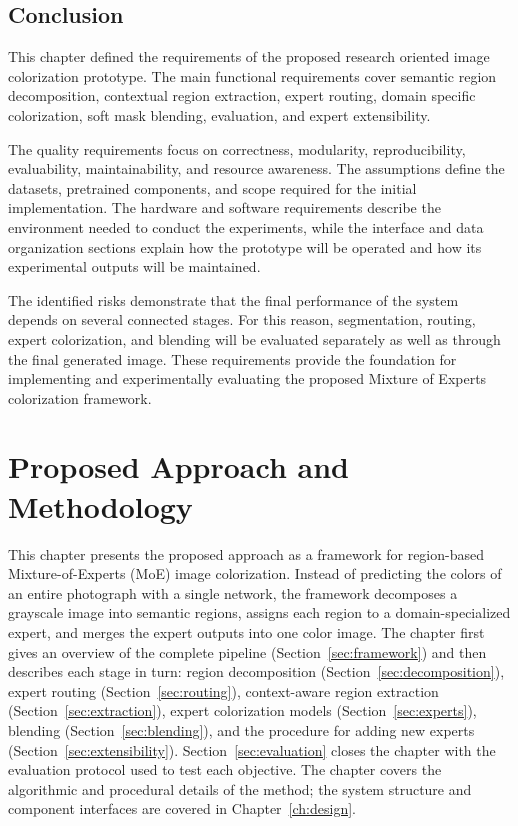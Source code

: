 \documentclass{FastFyp}
\begin{document}
\section{Conclusion}

This chapter defined the requirements of the proposed research oriented image colorization prototype. The main functional requirements cover semantic region decomposition, contextual region extraction, expert routing, domain specific colorization, soft mask blending, evaluation, and expert extensibility.

The quality requirements focus on correctness, modularity, reproducibility, evaluability, maintainability, and resource awareness. The assumptions define the datasets, pretrained components, and scope required for the initial implementation. The hardware and software requirements describe the environment needed to conduct the experiments, while the interface and data organization sections explain how the prototype will be operated and how its experimental outputs will be maintained.

The identified risks demonstrate that the final performance of the system depends on several connected stages. For this reason, segmentation, routing, expert colorization, and blending will be evaluated separately as well as through the final generated image. These requirements provide the foundation for implementing and experimentally evaluating the proposed Mixture of Experts colorization framework.

\chapter{Proposed Approach and Methodology}
\label{ch:method}

This chapter presents the proposed approach as a framework for region-based Mixture-of-Experts (MoE) image colorization. Instead of predicting the colors of an entire photograph with a single network, the framework decomposes a grayscale image into semantic regions, assigns each region to a domain-specialized expert, and merges the expert outputs into one color image. The chapter first gives an overview of the complete pipeline (Section~\ref{sec:framework}) and then describes each stage in turn: region decomposition (Section~\ref{sec:decomposition}), expert routing (Section~\ref{sec:routing}), context-aware region extraction (Section~\ref{sec:extraction}), expert colorization models (Section~\ref{sec:experts}), blending (Section~\ref{sec:blending}), and the procedure for adding new experts (Section~\ref{sec:extensibility}). Section~\ref{sec:evaluation} closes the chapter with the evaluation protocol used to test each objective. The chapter covers the algorithmic and procedural details of the method; the system structure and component interfaces are covered in Chapter~\ref{ch:design}.
\end{document}
